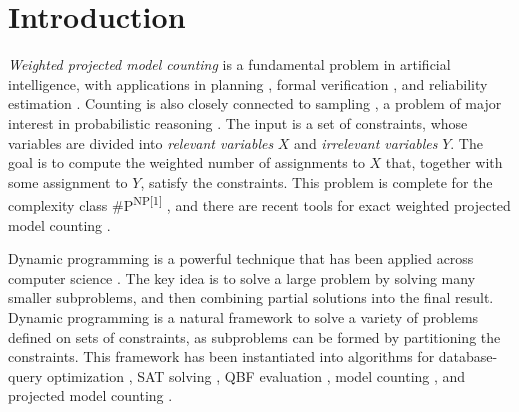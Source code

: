 






\section{Introduction}

\emph{Weighted projected model counting} is a fundamental problem in artificial intelligence, with applications in planning \cite{aziz2015projected}, formal verification \cite{klebanov2013sat}, and reliability estimation \cite{duenas2017counting}. Counting is also closely connected to sampling
\cite{jerrum1986random}, a problem of major interest in probabilistic reasoning \cite{kelly2019adaptive}.
The input is a set of constraints, whose variables are divided into \emph{relevant variables} $X$ and \emph{irrelevant variables} $Y$.
The goal is to compute the weighted number of assignments to $X$ that, together with some assignment to $Y$, satisfy the constraints.
This problem is complete for the complexity class \#P\textsuperscript{NP[1]} 
\cite{zawadzki2013generalization}, and
there are recent tools for exact weighted projected model counting \cite{lagniez2019recursive,lee2017solving}.


Dynamic programming is a powerful technique that has been applied across computer science \cite{bellman1966dynamic}.
The key idea is to solve a large problem by solving many smaller subproblems, and then combining partial solutions into the final result.
Dynamic programming is a natural framework to solve a variety of problems defined on sets of constraints, as subproblems can be formed by partitioning the constraints.
This framework has been instantiated into algorithms for database-query optimization \cite{mcmahan2004projection}, SAT solving \cite{uribe1994ordered,aguirre2001random,pan2005symbolic}, QBF evaluation \cite{charwat2016bdd}, model counting \cite{bacchus2009solving,samer2010algorithms,jegou2016improving,dudek2020dpmc,fichte2020exploiting}, and projected model counting \cite{fichte2020counting}.

